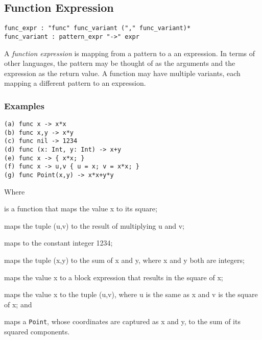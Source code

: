 \subsection{Function Expression}

\begin{lstlisting}[language=EBNF]
func_expr : "func" func_variant ("," func_variant)*
func_variant : pattern_expr "->" expr
\end{lstlisting}

A \emph{function expression} is mapping from a pattern to a an expression. In
terms of other languages, the pattern may be thought of as the arguments and the
expression as the return value. A function may have multiple variants, each
mapping a different pattern to an expression.

\subsubsection{Examples}

\begin{lstlisting}
(a) func x -> x*x
(b) func x,y -> x*y
(c) func nil -> 1234
(d) func (x: Int, y: Int) -> x+y
(e) func x -> { x*x; }
(f) func x -> u,v { u = x; v = x*x; }
(g) func Point(x,y) -> x*x+y*y
\end{lstlisting}

Where \begin{exdesc}
	\item is a function that maps the value x to its square;
	\item maps the tuple (u,v) to the result of multiplying u and v;
	\item maps to the constant integer 1234;
	\item maps the tuple (x,y) to the sum of x and y, where x and y both are
	      integers;
	\item maps the value x to a block expression that results in the square of
	      x;
	\item maps the value x to the tuple (u,v), where u is the same as x and v is
	      the square of x; and
	\item maps a \lstinline{Point}, whose coordinates are captured as x and y,
	      to the sum of its squared components.
\end{exdesc}
